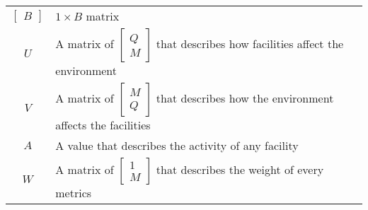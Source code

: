 \documentclass[./main.tex]{subfiles}
\begin{document}
\begin{longtable}{c l}
        $\begin{bmatrix} B \end{bmatrix}$ & $1\times B$ matrix \\[0.4cm]
        $U$ & A matrix of $\begin{bmatrix} Q \\ M \end{bmatrix}$ that describes how facilities affect the environment \\[0.5cm]
        $V$ & A matrix of $\begin{bmatrix} M \\ Q \end{bmatrix}$ that describes how the environment affects the
        facilities \\[0.5cm]
        $A$ & A value that describes the activity of any facility \\[0.2cm]
        $W$ & A matrix of $\begin{bmatrix} 1 \\ M \end{bmatrix}$ that describes the weight of every metrics \\[0.2cm]
        \bottomrule

    \end{longtable}
\end{document}
